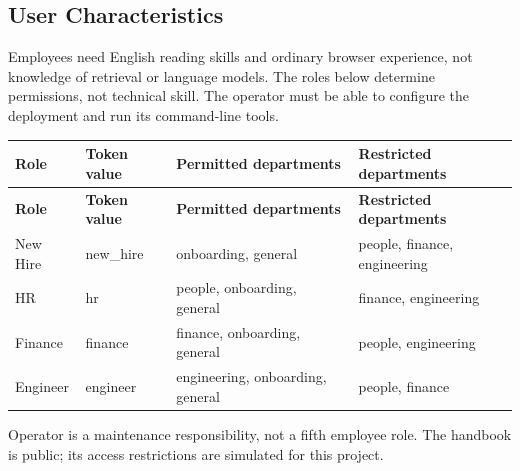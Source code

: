 \documentclass[11pt,letterpaper]{article}
\begin{document}
\subsection{User Characteristics}

Employees need English reading skills and ordinary browser experience, not knowledge of retrieval or language models. The roles below determine permissions, not technical skill. The operator must be able to configure the deployment and run its command-line tools.\par

\begingroup\small

\begin{longtable}{|P{\arrayrulewidth\relax}|P{\arrayrulewidth\relax}|P{\arrayrulewidth\relax}|P{\arrayrulewidth\relax}|}

\hline{}

\textbf{Role} & \textbf{Token value} & \textbf{Permitted departments} & \textbf{Restricted departments} \\ \hline

\endfirsthead

\hline{}

\textbf{Role} & \textbf{Token value} & \textbf{Permitted departments} & \textbf{Restricted departments} \\ \hline

\endhead

\hline\endfoot

\hline\endlastfoot

New Hire & new\_hire & onboarding, general & people, finance, engineering \\ \hline

HR & hr & people, onboarding, general & finance, engineering \\ \hline

Finance & finance & finance, onboarding, general & people, engineering \\ \hline

Engineer & engineer & engineering, onboarding, general & people, finance \\ \hline

\end{longtable}

\endgroup

Operator is a maintenance responsibility, not a fifth employee role. The handbook is public; its access restrictions are simulated for this project.\par
\end{document}
